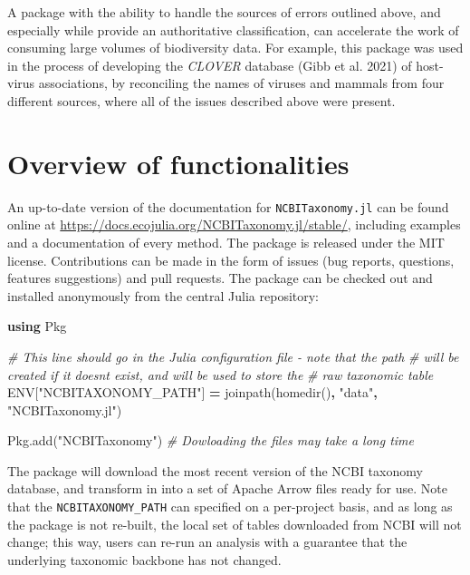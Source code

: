 \documentclass[10pt,oneside]{article}
\newenvironment{Shaded}{\begin{snugshade}}{\end{snugshade}}
\newcommand{\KeywordTok}[1]{\textcolor[rgb]{0.13,0.29,0.53}{\textbf{#1}}}
\newcommand{\ConstantTok}[1]{\textcolor[rgb]{0.00,0.00,0.00}{#1}}
\newcommand{\StringTok}[1]{\textcolor[rgb]{0.31,0.60,0.02}{#1}}
\newcommand{\CommentTok}[1]{\textcolor[rgb]{0.56,0.35,0.01}{\textit{#1}}}
\newcommand{\OperatorTok}[1]{\textcolor[rgb]{0.81,0.36,0.00}{\textbf{#1}}}
\newcommand{\NormalTok}[1]{#1}
\begin{document}
A package with the ability to handle the sources of errors outlined
above, and especially while provide an authoritative classification, can
accelerate the work of consuming large volumes of biodiversity data. For
example, this package was used in the process of developing the
\emph{CLOVER} database (Gibb et al. 2021) of host-virus associations, by
reconciling the names of viruses and mammals from four different
sources, where all of the issues described above were present.

\hypertarget{overview-of-functionalities}{%
\section{Overview of
functionalities}\label{overview-of-functionalities}}

An up-to-date version of the documentation for \texttt{NCBITaxonomy.jl}
can be found online at
\url{https://docs.ecojulia.org/NCBITaxonomy.jl/stable/}, including
examples and a documentation of every method. The package is released
under the MIT license. Contributions can be made in the form of issues
(bug reports, questions, features suggestions) and pull requests. The
package can be checked out and installed anonymously from the central
Julia repository:

\begin{Shaded}
\begin{Highlighting}[]
\KeywordTok{using}\NormalTok{ Pkg}

\CommentTok{\# This line should go in the Julia configuration file {-} note that the path}
\CommentTok{\# will be created if it doesn\textquotesingle{}t exist, and will be used to store the}
\CommentTok{\# raw taxonomic table}
\ConstantTok{ENV}\NormalTok{[}\StringTok{"NCBITAXONOMY\_PATH"}\NormalTok{] }\OperatorTok{=}\NormalTok{ joinpath(homedir()}\OperatorTok{,} \StringTok{"data"}\OperatorTok{,} \StringTok{"NCBITaxonomy.jl"}\NormalTok{)}

\NormalTok{Pkg.add(}\StringTok{"NCBITaxonomy"}\NormalTok{) }\CommentTok{\# Dowloading the files may take a long time}
\end{Highlighting}
\end{Shaded}

The package will download the most recent version of the NCBI taxonomy
database, and transform in into a set of Apache Arrow files ready for
use. Note that the \texttt{NCBITAXONOMY\_PATH} can specified on a
per-project basis, and as long as the package is not re-built, the local
set of tables downloaded from NCBI will not change; this way, users can
re-run an analysis with a guarantee that the underlying taxonomic
backbone has not changed.
\end{document}

